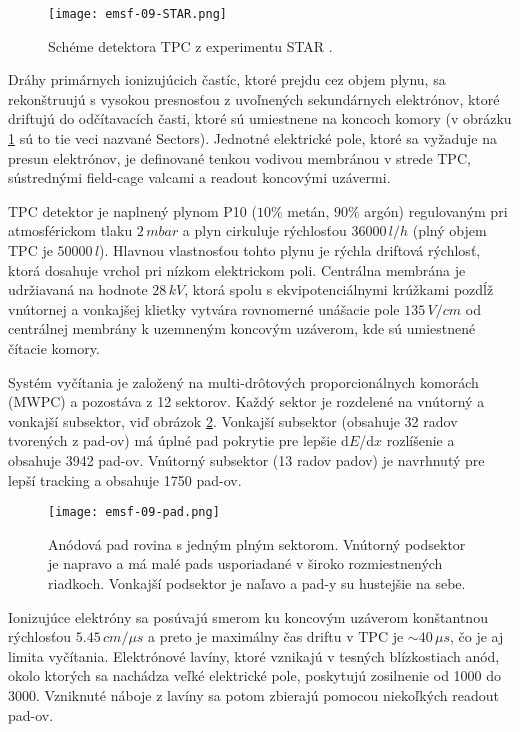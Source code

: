 \documentclass[../../main.tex]{subfiles}
\begin{document}
\begin{figure}[!h]
\texttt{[image: emsf-09-STAR.png]}
\centering
\caption{Schéme detektora TPC z experimentu STAR .}
\label{em9:fig:STAR}
\end{figure}

Dráhy primárnych ionizujúcich častíc, ktoré prejdu cez objem plynu, sa rekonštruujú s vysokou presnosťou z uvoľnených sekundárnych elektrónov, ktoré driftujú do odčítavacích časti, ktoré sú umiestnene na koncoch komory (v obrázku \ref{em9:fig:STAR} sú to tie veci nazvané Sectors). Jednotné elektrické pole, ktoré sa vyžaduje na presun elektrónov, je definované tenkou vodivou membránou v strede TPC, sústrednými field-cage valcami a readout koncovými uzávermi.

TPC detektor je naplnený plynom P10 ($10\%$ metán, $90\%$ argón) regulovaným pri atmosférickom tlaku $2\,\unit{mbar}$ a plyn cirkuluje rýchlosťou $36 000\,\unit{l/h}$ (plný objem TPC je $50 000\,\unit{l}$). Hlavnou vlastnosťou tohto plynu je rýchla driftová rýchlosť, ktorá dosahuje vrchol pri nízkom elektrickom poli. Centrálna membrána je udržiavaná na hodnote $28\,\unit{kV}$, ktorá spolu s ekvipotenciálnymi krúžkami pozdĺž vnútornej a vonkajšej klietky vytvára rovnomerné unášacie pole $135\,\unit{V/cm}$ od centrálnej membrány k uzemneným koncovým uzáverom, kde sú umiestnené čítacie komory.

Systém vyčítania je založený na multi-drôtových proporcionálnych komorách (MWPC) a pozostáva z 12 sektorov. Každý sektor je rozdelené na vnútorný a vonkajší subsektor, viď obrázok \ref{em9:fig:pad}. Vonkajší subsektor (obsahuje 32 radov tvorených z pad-ov) má úplné pad pokrytie pre lepšie d$E$/d$x$ rozlíšenie a obsahuje 3942 pad-ov. Vnútorný subsektor (13 radov padov) je navrhnutý pre lepší tracking a obsahuje 1750 pad-ov.

\begin{figure}[!h]
\texttt{[image: emsf-09-pad.png]}
\centering
\caption{Anódová pad rovina s jedným plným sektorom. Vnútorný podsektor je napravo a má malé pads usporiadané v široko rozmiestnených riadkoch. Vonkajší podsektor je naľavo a pad-y su hustejšie na sebe.}
\label{em9:fig:pad}
\end{figure}

Ionizujúce elektróny sa posúvajú smerom ku koncovým uzáverom konštantnou rýchlosťou $5.45\,\unit{cm/\mu s}$ a preto je maximálny čas driftu v TPC je $\sim \unit{40\,\mu s}$, čo je aj limita vyčítania. Elektrónové lavíny, ktoré vznikajú v tesných blízkostiach anód, okolo ktorých sa nachádza veľké elektrické pole, poskytujú zosilnenie od 1000 do 3000. Vzniknuté náboje z lavíny sa potom zbierajú pomocou niekoľkých readout pad-ov.
\end{document}
